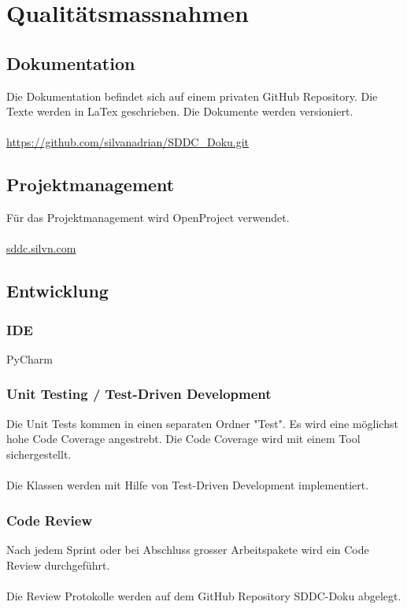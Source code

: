 \documentclass[11pt]{scrartcl}
\begin{document}
\section{Qualitätsmassnahmen}
\subsection{Dokumentation}
Die Dokumentation befindet sich auf einem privaten GitHub Repository.
Die Texte werden in LaTex geschrieben. Die Dokumente werden versioniert.\\
\\
\url{https://github.com/silvanadrian/SDDC_Doku.git}

\subsection{Projektmanagement}
Für das Projektmanagement wird OpenProject verwendet.\\
\\
\url{sddc.silvn.com}


\subsection{Entwicklung}

\subsubsection{IDE}
PyCharm\\

\subsubsection{Unit Testing / Test-Driven Development}
Die Unit Tests kommen in einen separaten Ordner "Test".
Es wird eine möglichst hohe Code Coverage angestrebt.
Die Code Coverage wird mit einem Tool sichergestellt.\\
\\
Die Klassen werden mit Hilfe von Test-Driven Development implementiert.

\subsubsection{Code Review}
Nach jedem Sprint oder bei Abschluss grosser Arbeitspakete wird ein Code Review durchgeführt.\\
\\
Die Review Protokolle werden auf dem GitHub Repository SDDC-Doku abgelegt.
\end{document}

